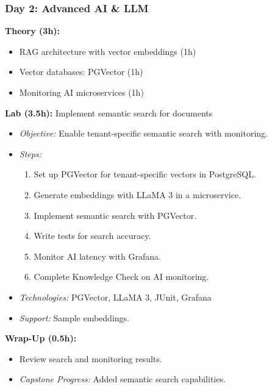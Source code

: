 \documentclass[11pt]{article}
\begin{document}
\subsubsection{Day 2: Advanced AI \& LLM}
\textbf{Theory (3h):}
\begin{itemize}
    \item RAG architecture with vector embeddings (1h)
    \item Vector databases: PGVector (1h)
    \item Monitoring AI microservices (1h)
\end{itemize}
\textbf{Lab (3.5h):} Implement semantic search for documents
\begin{itemize}
    \item \textit{Objective:} Enable tenant-specific semantic search with monitoring.
    \item \textit{Steps:}
        \begin{enumerate}
            \item Set up PGVector for tenant-specific vectors in PostgreSQL.
            \item Generate embeddings with LLaMA 3 in a microservice.
            \item Implement semantic search with PGVector.
            \item Write tests for search accuracy.
            \item Monitor AI latency with Grafana.
            \item Complete Knowledge Check on AI monitoring.
        \end{enumerate}
    \item \textit{Technologies:} PGVector, LLaMA 3, JUnit, Grafana
    \item \textit{Support:} Sample embeddings.
\end{itemize}
\textbf{Wrap-Up (0.5h):}
\begin{itemize}
    \item Review search and monitoring results.
    \item \textit{Capstone Progress:} Added semantic search capabilities.
\end{itemize}
\end{document}

